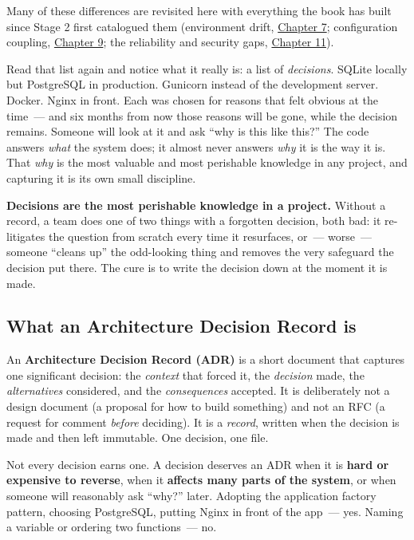 Many of these differences are revisited here with everything the book has built since Stage 2 first catalogued them (environment drift, \hyperref[ch:07-environment-drift]{Chapter 7}; configuration coupling, \hyperref[ch:09-configuration-coupling]{Chapter 9}; the reliability and security gaps, \hyperref[ch:11-reliability-security-gaps]{Chapter 11}).

Read that list again and notice what it really is: a list of \emph{decisions}. SQLite locally but PostgreSQL in production. Gunicorn instead of the development server. Docker. Nginx in front. Each was chosen for reasons that felt obvious at the time~--- and six months from now those reasons will be gone, while the decision remains. Someone will look at it and ask ``why is this like this?'' The code answers \emph{what} the system does; it almost never answers \emph{why} it is the way it is. That \emph{why} is the most valuable and most perishable knowledge in any project, and capturing it is its own small discipline.

\textbf{Decisions are the most perishable knowledge in a project.} Without a record, a team does one of two things with a forgotten decision, both bad: it re-litigates the question from scratch every time it resurfaces, or~--- worse~--- someone ``cleans up'' the odd-looking thing and removes the very safeguard the decision put there. The cure is to write the decision down at the moment it is made.

\subsection*{What an Architecture Decision Record is}\label{39-local-vs-production:what-an-architecture-decision-record-is}

An \textbf{Architecture Decision Record (ADR)} is a short document that captures one significant decision: the \emph{context} that forced it, the \emph{decision} made, the \emph{alternatives} considered, and the \emph{consequences} accepted. It is deliberately not a design document (a proposal for how to build something) and not an RFC (a request for comment \emph{before} deciding). It is a \emph{record}, written when the decision is made and then left immutable. One decision, one file.

Not every decision earns one. A decision deserves an ADR when it is \textbf{hard or expensive to reverse}, when it \textbf{affects many parts of the system}, or when someone will reasonably ask ``why?'' later. Adopting the application factory pattern, choosing PostgreSQL, putting Nginx in front of the app~--- yes. Naming a variable or ordering two functions~--- no.

